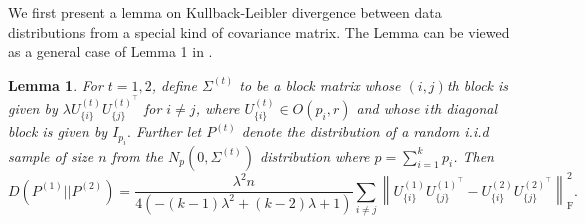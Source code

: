 \documentclass[11pt]{article}
\newcommand{\dc}[1]{\{#1\}} %
\newcommand{\0}{{\mathbf{0}}}
\newtheorem{lemma}[theorem]{Lemma}
\begin{document}
We first present a lemma on Kullback-Leibler divergence between data distributions from a special kind of covariance matrix. The Lemma can be viewed as a general case of Lemma 1 in \cite{gao2015supplement}.
\begin{lemma}
\label{lemma:KL-latent-variable-model}
For $t=1, 2$, define $\Sigma^{(t)}$ to be a block matrix whose $(i, j)$th block is given by $\lambda U_{\dc{i}}^{(t)}U_{\dc{j}}^{{(t)}^\top}$ for $i\neq j$, where $U_{\dc{i}}^{(t)}\in O(p_i, r)$ and whose $i$th diagonal block is given by $I_{p_i}.$ Further let $P^{(t)}$ denote the distribution of a random i.i.d sample of size $n$ from the $N_p(0, \Sigma^{(t)})$ distribution where $p=\sum_{i=1}^k p_i$. Then \begin{equation*}
    D(P^{(1)}||P^{(2)}) = \frac{\lambda^2 n}{4\left(-(k-1)\lambda^2+(k-2)\lambda+1\right)}\sum_{i\neq j}\left\|U_{\dc{i}}^{(1)}U_{\dc{j}}^{{(1)}^\top}-U_{\dc{i}}^{(2)}U_{\dc{j}}^{{(2)}^\top}\right\|_\mathrm{F}^2.
\end{equation*}
\end{lemma}
\end{document}
